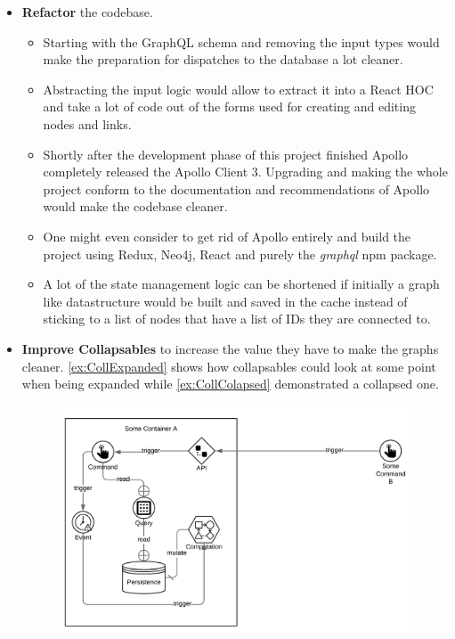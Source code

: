\begin{itemize}
\item \textbf{Refactor} the codebase.
\begin{itemize}
\item Starting with the GraphQL schema and removing the input types would make the preparation for dispatches to the database a lot cleaner. 
\item Abstracting the input logic would allow to extract it into a React HOC and take a lot of code out of the forms used for creating and editing nodes and links.
\item Shortly after the development phase of this project finished Apollo completely released the Apollo Client 3. Upgrading and making the whole project conform to the documentation and recommendations of Apollo would make the codebase cleaner.
\item One might even consider to get rid of Apollo entirely and build the project using Redux, Neo4j, React and purely the \emph{graphql} npm package.
\item A lot of the state management logic can be shortened if initially a graph like datastructure would be built and saved in the cache instead of sticking to a list of nodes that have a list of IDs they are connected to.
\end{itemize}

\item \textbf{Improve Collapsables} to increase the value they have to make the graphs cleaner. \autoref{ex:CollExpanded} shows how collapsables could look at some point when being expanded while \autoref{ex:CollColapsed} demonstrated a collapsed one.

\begin{figure}
\centering
\includegraphics[scale=.2]{Bilder/CollapsableEx.png}
\label{ex:CollExpanded}
\end{figure}


\end{itemize}
